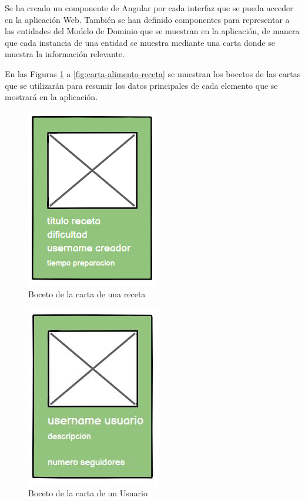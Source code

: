 Se ha creado un componente de Angular por cada interfaz que se pueda acceder en la aplicación Web. También se han definido componentes para representar a las entidades del Modelo de Dominio que se muestran en la aplicación, de manera que cada instancia de una entidad se muestra mediante una carta donde se muestra la información relevante.  

En las Figuras \ref{fig:carta-receta} a \ref{fig:carta-alimento-receta} se muestran los bocetos de las cartas que se utilizarán para resumir los datos principales de cada elemento que se mostrará en la aplicación.




\begin{figure}[H]
    \centering
    \includegraphics{img/carta-receta.jpg}
    \caption{Boceto de la carta de una receta}
    \label{fig:carta-receta}
\end{figure}




\begin{figure}[H]
    \centering
    \includegraphics{img/carta-usuario.jpg}
    \caption{Boceto de la carta de un Usuario}
    \label{fig:carta-usuario}
\end{figure}




